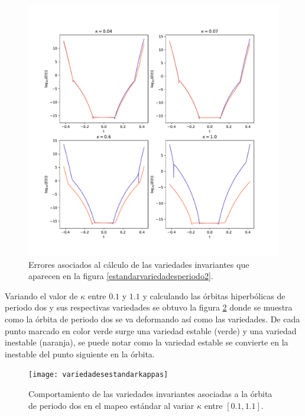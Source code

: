 \begin{figure}
	\centering
	\includegraphics[scale=0.7]{erroresvariedadesestandarperiodo2}
	\caption{Errores asociados al c\'alculo de las variedades invariantes que aparecen en la figura \ref{estandarvariedadesperiodo2}.}
	\label{erroresvariedadesestandarperiodo2}
\end{figure}
Variando el valor de $\kappa$ entre $0.1$ y $1.1$ y calculando las \'orbitas hiperb\'olicas de periodo dos y sus respectivas variedades se obtuvo la figura  \ref{variedadesestandarkappasv} donde se muestra como la \'orbita de periodo dos se va deformando as\'i como las variedades. De cada punto marcado en color verde surge una variedad estable (verde) y una variedad inestable (naranja), se puede notar como la variedad estable se convierte en la inestable del punto siguiente en la \'orbita. 
\begin{figure}
	\centering
	\texttt{[image: variedadesestandarkappas]}
	\caption{Comportamiento de las variedades invariantes asociadas a la \'orbita de periodo dos en el mapeo est\'andar al variar $\kappa$ entre $[0.1,1.1]$.}
	\label{variedadesestandarkappasv}
\end{figure}

